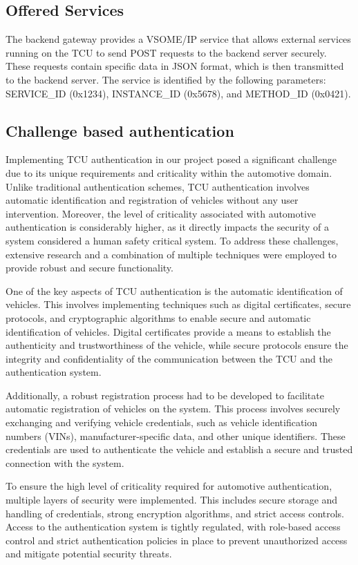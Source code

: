 \documentclass[
12pt,
oneside, 
onehalfspacing, 
nolistspacing, 
parskip, 
chapterinoneline, 
]{AASTCOMPUTER}
\begin{document}
\subsection{Offered Services}
The backend gateway provides a VSOME/IP service that allows external services running on the TCU to send POST requests to the backend server securely. These requests contain specific data in JSON format, which is then transmitted to the backend server. The service is identified by the following parameters: SERVICE\_ID (0x1234), INSTANCE\_ID (0x5678), and METHOD\_ID (0x0421).

\subsection{Challenge based authentication}
Implementing TCU authentication in our project posed a significant challenge due to its unique requirements and criticality within the automotive domain. Unlike traditional authentication schemes, TCU authentication involves automatic identification and registration of vehicles without any user intervention. Moreover, the level of criticality associated with automotive authentication is considerably higher, as it directly impacts the security of a system considered a human safety critical system. To address these challenges, extensive research and a combination of multiple techniques were employed to provide robust and secure functionality.

One of the key aspects of TCU authentication is the automatic identification of vehicles. This involves implementing techniques such as digital certificates, secure protocols, and cryptographic algorithms to enable secure and automatic identification of vehicles. Digital certificates provide a means to establish the authenticity and trustworthiness of the vehicle, while secure protocols ensure the integrity and confidentiality of the communication between the TCU and the authentication system.

Additionally, a robust registration process had to be developed to facilitate automatic registration of vehicles on the system. This process involves securely exchanging and verifying vehicle credentials, such as vehicle identification numbers (VINs), manufacturer-specific data, and other unique identifiers. These credentials are used to authenticate the vehicle and establish a secure and trusted connection with the system.

To ensure the high level of criticality required for automotive authentication, multiple layers of security were implemented. This includes secure storage and handling of credentials, strong encryption algorithms, and strict access controls. Access to the authentication system is tightly regulated, with role-based access control and strict authentication policies in place to prevent unauthorized access and mitigate potential security threats.
\end{document}
